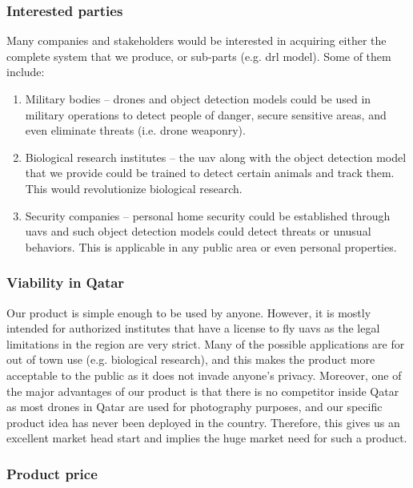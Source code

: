 \subsubsection{Interested parties}
	Many companies and stakeholders would be interested in acquiring either the
	complete system that we produce, or sub-parts (e.g. \gls{drl} model). Some of them include:
	\begin{enumerate}
		\item Military bodies -- drones and object detection models could 
		be used in military operations to detect people of danger, secure 
		sensitive areas, and even eliminate threats (i.e. drone weaponry).
		
		\item Biological research institutes -- 
                    the \gls{uav} along with the object
		detection model that we provide could be trained to detect certain animals 
		and track them. This would revolutionize biological research.
		
		\item Security companies -- personal home security could be established through
		\glspl{uav} and such object detection models could detect threats or unusual
		behaviors. This is applicable in any public area or even personal properties.		
		
	\end{enumerate}

\subsubsection{Viability in Qatar}
	Our product is simple enough to be used by anyone. However, it is mostly intended for 
	authorized institutes that have a license to fly \glspl{uav} as the legal limitations 
	in the region are very strict. 
	Many of the possible applications are for out of town use (e.g. biological research), 
	and this makes the product more acceptable to the public as it does not invade anyone's privacy.
	Moreover, one of the major advantages of our product is that there is no competitor 
	inside Qatar as most drones in Qatar are used for photography purposes, and our
	specific product idea has never been deployed in the country. Therefore, this gives us an excellent 
	market head start and implies the huge market need for such a product.

\subsubsection{Product price}

